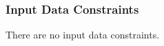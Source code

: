\documentclass[12pt]{article}
\begin{document}

%

\subsubsection{Input Data Constraints} \label{sec_DataConst}

There are no input data constraints.



\end{document}
